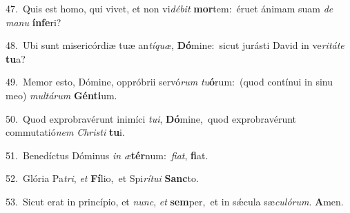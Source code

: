 {\numbfont\textcolor{\numbcolor}{47.}}~Quis est homo, qui vivet, et non vi\-\textit{dé}\-\textit{bit} \textbf{mor}\-tem:~\star éruet ánimam suam \textit{de} \textit{ma}\-\textit{nu} \textbf{ín}\-\textbf{fe}ri?\par
{\numbfont\textcolor{\numbcolor}{48.}}~Ubi sunt misericórdiæ tuæ an\-\textit{tí}\-\textit{quæ}, \textbf{Dó}\-mine:~\star sicut jurásti David in ve\-\textit{ri}\-\textit{tá}\textit{te} \textbf{tu}\-a?\par
{\numbfont\textcolor{\numbcolor}{49.}}~Memor esto, Dómine, oppróbrii servó\textit{rum} \textit{tu}\-\textbf{ó}rum:~\star (quod contínui in sinu meo) \textit{mul}\-\textit{tá}\textit{rum} \textbf{Gén}\-\textbf{ti}um.\par
{\numbfont\textcolor{\numbcolor}{50.}}~Quod exprobravérunt inimíci \textit{tu}\-\textit{i}, \textbf{Dó}\-mine,~\star quod exprobravérunt commutatió\textit{nem} \textit{Chris}\-\textit{ti} \textbf{tu}\-i.\par
{\numbfont\textcolor{\numbcolor}{51.}}~Benedíctus Dóminus \textit{in} \textit{æ}\-\textbf{tér}num:~\star \textit{fi}\-\textit{at}, \textbf{fi}\-at.\par
{\numbfont\textcolor{\numbcolor}{52.}}~Glória Pa\-\textit{tri}\-, \textit{et} \textbf{Fí}\-lio,~\star et Spi\-\textit{rí}\-\textit{tu}\textit{i} \textbf{Sanc}\-to.\par
{\numbfont\textcolor{\numbcolor}{53.}}~Sicut erat in princípio, et \textit{nunc}\-, \textit{et} \textbf{sem}\-per,~\star et in sǽcula sæ\-\textit{cu}\-\textit{ló}\textit{rum}. \textbf{A}\-men.\par
